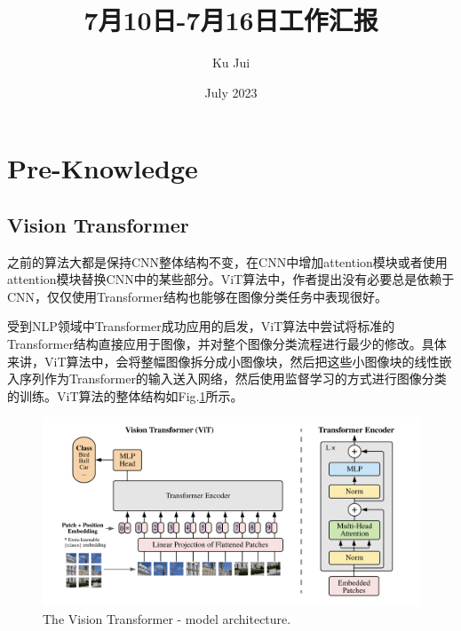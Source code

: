 \documentclass[letterpaper,10pt]{article}
\begin{document}
	
	
	\title{\songti {}7月10日-7月16日工作汇报}
	\author{\textrm{Ku Jui}}
	\date{\textrm{July 2023}}
	\maketitle
	
	\renewcommand{\figurename}{Figure} %
	\renewcommand{\contentsname}{Contents}
	\renewcommand{\tablename}{Table}
	\tableofcontents  %
	
	\section{Pre-Knowledge}
		
	\subsection{Vision Transformer \cite{dosovitskiy2021image}}
	
	之前的算法大都是保持CNN整体结构不变，在CNN中增加attention模块或者使用attention模块替换CNN中的某些部分。ViT算法中，作者提出没有必要总是依赖于CNN，仅仅使用Transformer结构也能够在图像分类任务中表现很好。
	
	受到NLP领域中Transformer成功应用的启发，ViT算法中尝试将标准的Transformer结构直接应用于图像，并对整个图像分类流程进行最少的修改。具体来讲，ViT算法中，会将整幅图像拆分成小图像块，然后把这些小图像块的线性嵌入序列作为Transformer的输入送入网络，然后使用监督学习的方式进行图像分类的训练。ViT算法的整体结构如Fig.\ref{fig: Vision Transformer}所示。
	
	\begin{figure}[htbp]
		\centering 
		\includegraphics[width=0.8\columnwidth]{picture/Vision-Transformer-architecture}
		\caption{
			\label{fig: Vision Transformer} The Vision Transformer - model architecture.
		}
	\end{figure}
	
\end{document}
